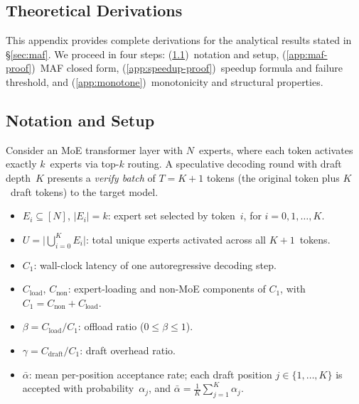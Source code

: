 \documentclass[letterpaper,twocolumn,10pt]{article}
\newcommand{\thetabar}{\bar{\alpha}}
\begin{document}



\begin{appendices}

\section{Theoretical Derivations}\label{app:theory}

This appendix provides complete derivations for the analytical
results stated in \S\ref{sec:maf}.  We proceed in four steps:
(\ref{app:notation})~notation and setup,
(\ref{app:maf-proof})~MAF closed form,
(\ref{app:speedup-proof})~speedup formula and failure threshold, and
(\ref{app:monotone})~monotonicity and structural properties.

\subsection{Notation and Setup}\label{app:notation}

Consider an MoE transformer layer with $N$~experts, where each token
activates exactly $k$~experts via top-$k$ routing.  A speculative decoding
round with draft depth~$K$ presents a \emph{verify batch} of $T = K+1$
tokens (the original token plus $K$~draft tokens) to the target model.

\begin{itemize}[leftmargin=*,itemsep=2pt]
\item $E_i \subseteq [N]$, $|E_i|=k$: expert set selected by token~$i$,
  for $i = 0,1,\dots,K$.
\item $U = \bigl|\bigcup_{i=0}^{K} E_i\bigr|$: total unique experts
  activated across all $K\!+\!1$~tokens.
\item $C_1$: wall-clock latency of one autoregressive decoding step.
\item $C_{\text{load}}$, $C_{\text{non}}$: expert-loading and non-MoE
  components of $C_1$, with $C_1 = C_{\text{non}} + C_{\text{load}}$.
\item $\beta = C_{\text{load}}/C_1$: offload ratio ($0 \leq \beta \leq 1$).
\item $\gamma = C_{\text{draft}}/C_1$: draft overhead ratio.
\item $\thetabar$: mean per-position acceptance rate; each draft position
  $j \in \{1,\dots,K\}$ is accepted with probability~$\alpha_j$, and
  $\thetabar = \frac{1}{K}\sum_{j=1}^{K} \alpha_j$.
\end{itemize}


\end{appendices}
\end{document}
